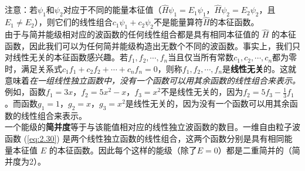 	\indent 注意：若$\psi_1$和$\psi_2$对应于不同的能量本征值（$\hat{H}\psi_1 = E_1\psi_1$，$\hat{H}\psi_2 = E_2\psi_2$，且$E_1 \neq E_2$），则它们的线性组合$c_1\psi_1+c_2\psi_2$不是能量算符$\hat{H}$的本征函数。\\
	\indent 由于与简并能级相对应的波函数的任何线性组合都是具有相同本征值的 $\hat{H}$ 的本征函数，因此我们可以为任何简并能级构造出无数个不同的波函数。事实上，我们只对线性无关的本征函数感兴趣。若$f_1,f_2,\cdots,f_n$当且仅当所有常数$c_1,c_2,\cdots,c_n$都为零时，满足关系式$c_1f_1+c_2f_2+\cdots+c_nf_n=0$，则称$f_1,f_2,\cdots,f_n$是\textbf{线性无关}的。这就意味着\textit{在一组线性独立函数中，没有一个函数可以用其余函数的线性组合来表示。}例如，函数$f_1=3x$，$f_2=5x^2-x$，$f_3=x^2$不是线性无关的，因为$f_2=5f_3-\frac{1}{3}f_1$。而函数$g_1=1$，$g_2=x$，$g_3=x^2$是线性无关的，因为没有一个函数可以用其余函数的线性组合来表示。\\
	\indent 一个能级的\textbf{简并度}等于与该能值相对应的线性独立波函数的数目。一维自由粒子波函数 (\ref{eq:2.30}) 是两个线性独立函数的线性组合，这两个函数分别是具有相同能量本征值 $E$ 的本征函数。因此每个这样的能级（除了$E=0$）都是二重简并的（简并度为2）。\\

